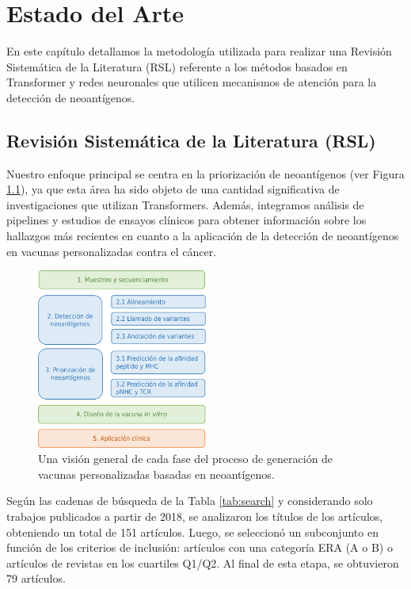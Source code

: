 \chapter{Estado del Arte}
\label{cap:estadodelarte}

En este capítulo detallamos la metodología utilizada para realizar una Revisión Sistemática de la Literatura (RSL) referente a los métodos basados en Transformer y redes neuronales que utilicen mecanismos de atención para la detección de neoantígenos.

\section{Revisión Sistemática de la Literatura (RSL)}

Nuestro enfoque principal se centra en la priorización de neoantígenos (ver Figura 	\ref{fig:etapas}), ya que esta área ha sido objeto de una cantidad significativa de investigaciones que utilizan Transformers. Además, integramos análisis de pipelines y estudios de ensayos clínicos para obtener información sobre los hallazgos más recientes en cuanto a la aplicación de la detección de neoantígenos en vacunas personalizadas contra el cáncer. 

\begin{figure}[h]
	\centering	
	\includegraphics[width=0.5\textwidth]{img/pipeline/pipeline_spanish}	
	\caption{Una visión general de cada fase del proceso de generación de vacunas personalizadas basadas en neoantígenos.}
	\label{fig:etapas}
\end{figure}


Según las cadenas de búsqueda de la Tabla \ref{tab:search} y considerando solo trabajos publicados a partir de 2018, se analizaron los títulos de los artículos, obteniendo un total de 151 artículos. Luego, se seleccionó un subconjunto en función de los criterios de inclusión: artículos con una categoría ERA (A o B) o artículos de revistas en los cuartiles Q1/Q2. Al final de esta etapa, se obtuvieron 79 artículos.


